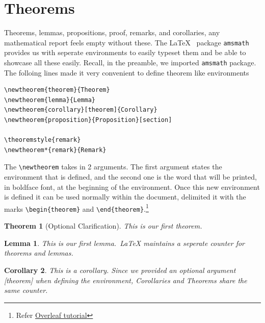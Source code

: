 \documentclass{article}
\newtheorem{theorem}{Theorem}
\newtheorem{lemma}{Lemma}
\newtheorem{corollary}[theorem]{Corollary}
\theoremstyle{remark}
\begin{document}
\clearpage

\section{Theorems}

    Theorems, lemmas, propositions, proof, remarks, and corollaries, any mathematical report feels
    empty without these. The \LaTeX~ package \verb!amsmath! provides us with seperate environments to easily
    typeset them and be able to showcase all these easily. Recall, in the preamble, we imported \verb!amsmath!
    package. The folloing lines made it very convenient to define theorem like environments

\begin{lstlisting}
\newtheorem{theorem}{Theorem}
\newtheorem{lemma}{Lemma}
\newtheorem{corollary}[theorem]{Corollary}
\newtheorem{proposition}{Proposition}[section]

\theoremstyle{remark}
\newtheorem*{remark}{Remark}
\end{lstlisting}

    The \verb!\newtheorem! takes in 2 arguments. The first argument states the environment that is defined, and the
    second one is the word that will be printed, in boldface font, at the beginning of the environment.
    Once this new environment is defined it can be used normally within the document, 
    delimited it with the marks \verb!\begin{theorem}! and \verb!\end{theorem}!.\footnote{Refer \href{https://www.overleaf.com/learn/latex/theorems_and_proofs}{Overleaf tutorial}}

    \begin{theorem}[Optional Clarification]
    \label{firsttheorem}
        This is our first theorem.
    \end{theorem}

    \begin{lemma}
    \label{firstlemma}
        This is our first lemma.~\LaTeX{} maintains a seperate counter for theorems and lemmas.
    \end{lemma}

    \begin{corollary}
    \label{firstcorollary}
        This is a corollary. Since we provided an optional argument [theorem] when defining the environment,
        Corollaries and Theorems share the same counter.
    \end{corollary}
\end{document}
